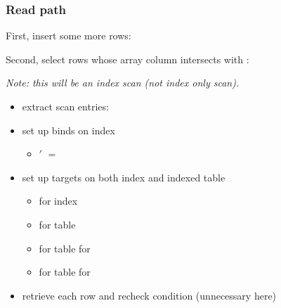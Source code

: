 \begin{frame}
  \frametitle{Read path}
  First, insert some more rows:


  \pause

  Second, select rows whose array column intersects with :

  \pause

  \emph{Note: this will be an index scan (not index only scan).}
  \pause

  \begin{itemize}
    \item extract scan entries: 
      \pause
    \item set up binds on index
      \begin{itemize}
        \item {}$'$ $=$ 
      \end{itemize}
      \pause
    \item set up targets on both index and indexed table
      \begin{itemize}
        \item {} for index
          \pause
        \item {} for table
          \pause
        \item {} for table for 
          \pause
        \item {} for table for 
      \end{itemize}
      \pause
    \item retrieve each row and recheck condition (unnecessary here)
  \end{itemize}
\end{frame}

